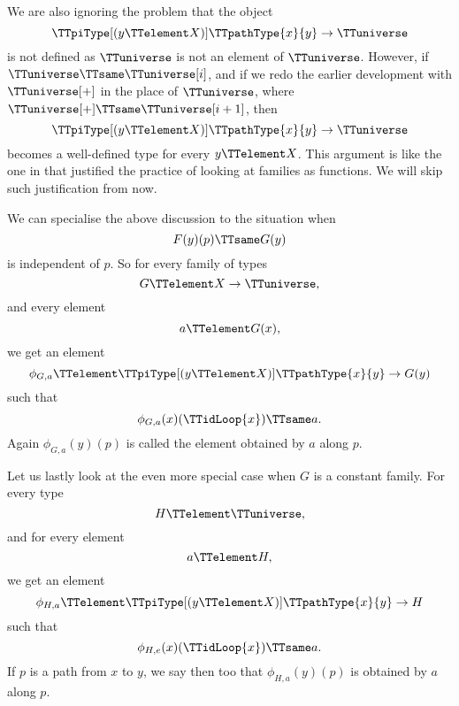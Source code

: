 \documentclass{article}
\begin{document}
We are also ignoring the problem that the object
\begin{equation*}
  \TTpiType[(y \TTelement X)]
  \TTpathType{x}{y} \to \TTuniverse
\end{equation*}
is not defined as $\TTuniverse$ is not an element of $\TTuniverse$.
However, if $\TTuniverse \TTsame \TTuniverse[i]$, and if we redo the
earlier development with $\TTuniverse[+]$ in the place of
$\TTuniverse$, where $\TTuniverse[+] \TTsame \TTuniverse[i+1]$, then
\begin{equation*}
  \TTpiType[(y \TTelement X)]
  \TTpathType{x}{y} \to \TTuniverse
\end{equation*}
becomes a well-defined type for every $y \TTelement X$.  This argument
is like the one in  that justified the
practice of looking at families as functions.  We will skip such
justification from now.

We can specialise the above discussion to the situation when
\begin{equation*}
  F(y)(p) \TTsame G(y)
\end{equation*}
is independent of $p$.  So for every family of types
\begin{equation*}
  G \TTelement X \to \TTuniverse,
\end{equation*}
and every element
\begin{equation*}
  a \TTelement G(x),
\end{equation*}
we get an element
\begin{equation*}
  \phi_{G,a} \TTelement \TTpiType[(y \TTelement X)]
  \TTpathType{x}{y} \to G(y)
\end{equation*}
such that
\begin{equation*}
  \phi_{G,a}(x)(\TTidLoop{x}) \TTsame a.
\end{equation*}
Again $\phi_{G,a}(y)(p)$ is called the element obtained by
 $a$ along $p$.

Let us lastly look at the even more special case when $G$ is a
constant family.  For every type
\begin{equation*}
  H \TTelement \TTuniverse,
\end{equation*}
and for every element
\begin{equation*}
  a \TTelement H,
\end{equation*}
we get an element
\begin{equation*}
  \phi_{H,a} \TTelement
  \TTpiType[(y \TTelement X)]
  \TTpathType{x}{y} \to H
\end{equation*}
such that
\begin{equation*}
  \phi_{H,e}(x)(\TTidLoop{x}) \TTsame a.
\end{equation*}
If $p$ is a path from $x$ to $y$, we say then too that
$\phi_{H,a}(y)(p)$ is obtained by  $a$ along
$p$.
\end{document}
